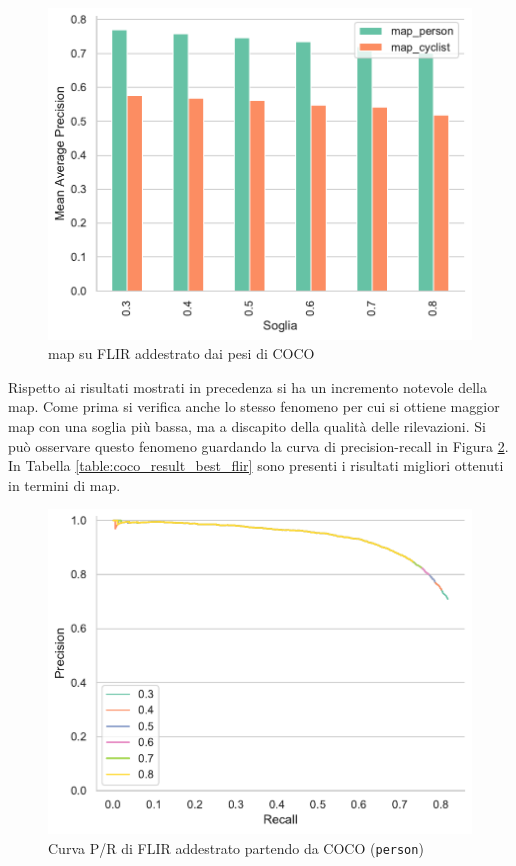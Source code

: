 \begin{figure}[]
    \centering
    \includegraphics[width=\textwidth]{images/graphic/flir_from_coco_map.pdf}
    \caption{\ac{map} su FLIR addestrato dai pesi di COCO}
    \label{fig:map_flir_from_coco}
\end{figure}
Rispetto ai risultati mostrati in precedenza si ha un incremento notevole della \ac{map}. Come prima si verifica anche lo stesso fenomeno per cui si ottiene maggior \ac{map} con una soglia più bassa, ma a discapito della qualità delle rilevazioni. Si può osservare questo fenomeno guardando la curva di precision-recall in Figura \ref{fig:precision_recall_curve_flir_coco}. In Tabella \ref{table:coco_result_best_flir} sono presenti i risultati migliori ottenuti in termini di \ac{map}. 
\begin{figure}[]
    \centering
    \includegraphics[width = \textwidth]{images/graphic/flir_coco_pr.pdf}
    \caption{Curva P/R di FLIR addestrato partendo da COCO (\texttt{person})}
    \label{fig:precision_recall_curve_flir_coco}
\end{figure}

